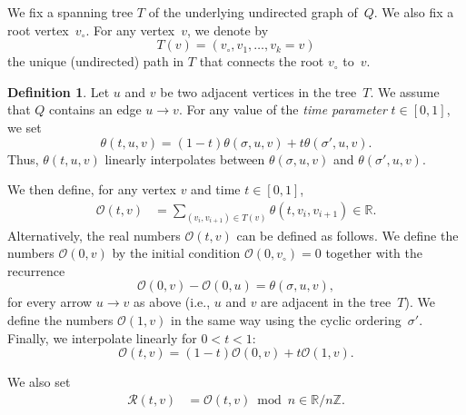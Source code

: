\documentclass[11pt, letterpaper]{amsart}
\theoremstyle{definition}
\newtheorem{definition}[theorem]{Definition}
\numberwithin{equation}{section}
\def\ZZ{{\mathbb Z}}
\def\RR{{\mathbb R}}
\def\O{{\mathcal{O}}}
\begin{document}

We fix a spanning tree $T$ of the underlying undirected graph of~$Q$.
We also fix a root vertex~$v_\circ$. 
For any vertex~$v$, we denote by
\begin{equation*}
T(v) = (v_\circ, v_1, \dots, v_k=v)
\end{equation*}
the unique (undirected) path in $T$ that connects the root $v_\circ$ to~$v$. 

\begin{definition}
\label{def:algorithm for wiggle equiv}
Let $u$ and $v$ be two adjacent vertices in the tree~$T$.
We assume that $Q$ contains an edge $u \rightarrow v$. 
For any value of the \emph{time parameter} $t\in [0,1]$, we set
\begin{equation*}
\theta(t, u,v) = (1-t) \theta(\sigma,u,v) + t \theta(\sigma',u,v).
\end{equation*}
Thus, $\theta(t, u,v)$ linearly interpolates between $\theta(\sigma, u,v)$ and $\theta(\sigma', u,v)$.  
 

We then define, for any vertex $v$ and time $t\in [0,1]$, 
\begin{align*}
\O(t,v) &= \sum_{(v_i, v_{i+1}) \in T(v)} \theta(t,v_i, v_{i+1}) \in \RR. 
\end{align*}
Alternatively, the real numbers $\O(t,v)$ can be defined as follows. 
We define the numbers $\O(0,v)$ by the initial condition $\O(0,v_\circ)=0$
together with the recurrence
\begin{equation*}
\O(0,v)-\O(0,u) = \theta(\sigma,u,v), 
\end{equation*}
for every arrow $u\rightarrow v$ as above (i.e., $u$ and $v$ are adjacent in the tree~$T$).
We define the numbers $\O(1,v)$ in the same way using the cyclic ordering~$\sigma'$. 
Finally, we interpolate linearly for $0<t<1$:
\begin{equation*}
\O(t,v)=(1-t) \O(0,v)+t \O(1,v). 
\end{equation*}

We also set
\begin{align*}
\mathcal{R}(t,v) &= \O(t,v) \bmod n \in \RR / n \ZZ. 
\end{align*}
\end{definition}
\end{document}
